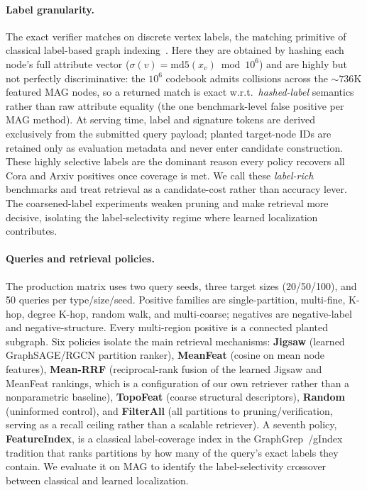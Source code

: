 \documentclass{article}
\begin{document}
\paragraph{Label granularity.} The exact verifier matches on discrete vertex labels, the matching primitive of classical label-based graph indexing~\cite{ref_graphgrep,ref_gindex}. Here they are obtained by hashing each node's full attribute vector ($\sigma(v)=\mathrm{md5}(x_v)\bmod 10^{6}$) and are highly but not perfectly discriminative: the $10^{6}$ codebook admits collisions across the ${\sim}736$K featured MAG nodes, so a returned match is exact w.r.t.\ \emph{hashed-label} semantics rather than raw attribute equality (the one benchmark-level false positive per MAG method). At serving time, label and signature tokens are derived exclusively from the submitted query payload; planted target-node IDs are retained only as evaluation metadata and never enter candidate construction. These highly selective labels are the dominant reason every policy recovers all Cora and Arxiv positives once coverage is met. We call these \emph{label-rich} benchmarks and treat retrieval as a candidate-cost rather than accuracy lever. The coarsened-label experiments weaken pruning and make retrieval more decisive, isolating the label-selectivity regime where learned localization contributes.

\paragraph{Queries and retrieval policies.}
The production matrix uses two query seeds, three target sizes (20/50/100), and 50 queries per type/size/seed. Positive families are single-partition, multi-fine, K-hop, degree K-hop, random walk, and multi-coarse; negatives are negative-label and negative-structure. Every multi-region positive is a connected planted subgraph. Six policies isolate the main retrieval mechanisms: \textbf{Jigsaw} (learned GraphSAGE/RGCN partition ranker), \textbf{MeanFeat} (cosine on mean node features), \textbf{Mean-RRF} (reciprocal-rank fusion of the learned Jigsaw and MeanFeat rankings, which is a configuration of our own retriever rather than a nonparametric baseline), \textbf{TopoFeat} (coarse structural descriptors), \textbf{Random} (uninformed control), and \textbf{FilterAll} (all partitions to pruning/verification, serving as a recall ceiling rather than a scalable retriever). A seventh policy, \textbf{FeatureIndex}, is a classical label-coverage index in the GraphGrep~\cite{ref_graphgrep}/gIndex~\cite{ref_gindex} tradition that ranks partitions by how many of the query's exact labels they contain. We evaluate it on MAG to identify the label-selectivity crossover between classical and learned localization.
\end{document}
